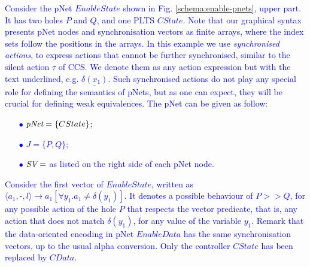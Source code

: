 \documentclass[smallcondensed]{svjour3}
\newcommand{\ERIC}[1]{\textcolor{blue}{#1}}
\begin{document}
\begin{example}\label{example:pNetEnable}
\ERIC{
  Consider the pNet $EnableState$ shown in Fig. \ref{schema:enable-pnets}, upper part. It has two holes $P$ and $Q$, and one PLTS $CState$. Note that our graphical syntax presents pNet nodes and synchronisation vectors as finite arrays, where the index sets follow the positions in the arrays.
  In this example we use \emph{synchronised actions}, to express actions that cannot be further synchronised, similar to the silent action $\tau$ of CCS. We denote them as any action expression but with the text underlined,  e.g. $\underline{\delta(x_1)}$. Such synchronised actions do not play any special role for defining the semantics of pNets, but as one can expect, they will be crucial for defining weak equivalences. The pNet can be given as follow:
\begin{itemize}
	\item[$\bullet$] $\pNet=\{CState\}$;
	\item[$\bullet$] $J=\{P, Q\}$;
	\item[$\bullet$] $\symb{SV}=$ as listed on the right side of each pNet node.
\end{itemize}
Consider the first  vector of $EnableState$, written as $\langle a_1, \text{-}, l\rangle\rightarrow a_1[\forall y_1. a_1\neq \delta(y_1)]$. It denotes a possible behaviour of $P>>Q$, for any possible action of the hole $P$ that respects the vector predicate, that is, any action that does not match $\delta(y_1)$, for any value of the variable $y_1$.
Remark that the data-oriented encoding in pNet $EnableData$ has the same synchronisation vectors, up to the usual alpha conversion. Only the controller $CState$ has been replaced by $CData$.
}
\end{example}

\end{document}
